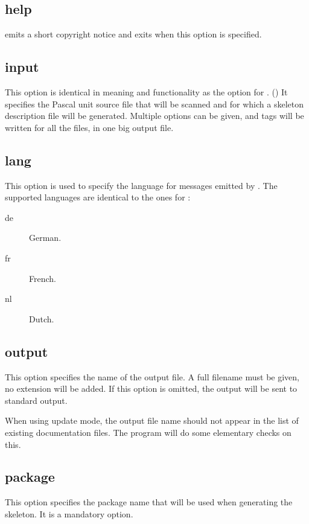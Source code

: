 \subsection{help}
\label{suse:mshelp}
 emits a short copyright notice and exits when this option is
specified.

\subsection{input}
\label{suse:msinput}
This option is identical in meaning and functionality as the 
option for \fpdoc. () It specifies the Pascal unit source 
file that will be scanned and for which a skeleton description file will be
generated. Multiple  options can be given, and 
tags will be written for all the files, in one big output file.

\subsection{lang}
\label{suse:mslang}
This option is used to specify the language for messages emitted by
. The supported languages are identical to the ones 
for \fpdoc:
\begin{description}
\item[de] German.
\item[fr] French.
\item[nl] Dutch.
\end{description}

\subsection{output}
\label{suse:msoutput}
This option specifies the name of the output file. A full filename must be
given, no extension will be added. If this option is omitted, the output
will be sent to standard output.

When using update mode, the output file name should not appear in the list of
existing documentation files. The  program will do some
elementary checks on this.

\subsection{package}
\label{suse:mspackage}
This option specifies the package name that will be used when generating the
skeleton. It is a mandatory option. 

